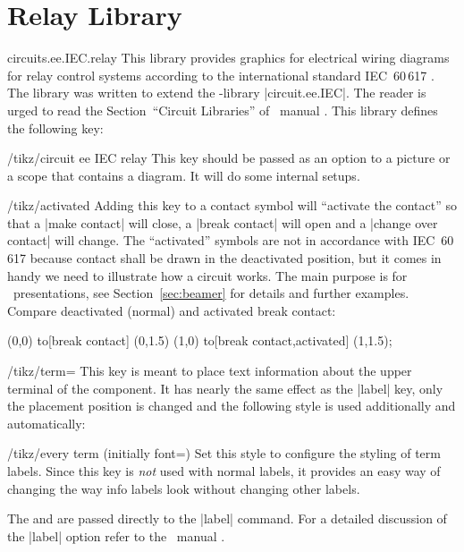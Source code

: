 \documentclass[a4paper]{ltxdoc}
\begin{document}
\section{Relay Library}
\begin{pgflibrary}{circuits.ee.IEC.relay}
This library provides graphics for electrical wiring diagrams for relay control systems according to the international standard IEC~60\,617 \cite{60617-2,60617-4,60617-7,60617-8}. The library was written to extend the \tikzname-library |circuit.ee.IEC|. The reader is urged to read the Section~``Circuit Libraries'' of \tikzname\ manual \cite{Tantau}.
This library defines the following key:

\begin{key}{/tikz/circuit ee IEC relay}
This key should be passed as an option to a picture or a scope that contains a diagram. It will do some internal setups.
\end{key}

\begin{key}{/tikz/activated}
Adding this key to a contact symbol will ``activate the contact'' so that a |make contact| will close, a |break contact| will open and a |change over contact| will change. The ``activated'' symbols are not in accordance with IEC~60\,617 because contact shall be drawn in the deactivated position, but it comes in handy we need to illustrate how a circuit works. The main purpose is for \beamer\ presentations, see Section~\ref{sec:beamer} for details and further examples. Compare deactivated (normal) and activated break contact:
\begin{codeexample}[width=3cm]
  \draw (0,0) to[break contact] (0,1.5)
        (1,0) to[break contact,activated] (1,1.5);
\end{codeexample}
\end{key}

\begin{key}{/tikz/term=}
  This key is meant to place text information about the upper terminal of the component. It has nearly the same effect as the |label| key, only the placement position is changed and the following style is used additionally and automatically:
  \begin{stylekey}{/tikz/every term (initially {font=\string\scriptsize})}
    Set this style to configure the styling of term labels. Since this
    key is \emph{not} used with normal labels, it provides an easy way
    of changing the way info labels look without changing other
    labels.
  \end{stylekey}
  The  and  are passed directly to the |label| command. For a detailed discussion of the |label| option refer to the \tikzname\ manual \cite{Tantau}.
  

\end{key}
\end{pgflibrary}
\end{document}
